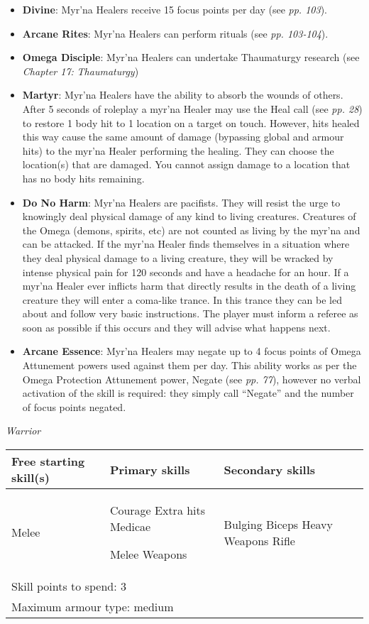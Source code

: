 \documentclass{scrbook}
\begin{document}
\begin{itemize}
\item \textbf{Divine}: Myr'na Healers receive 15 focus points per day (see \textit{pp. 103}).

\item \textbf{Arcane Rites}: Myr'na Healers can perform rituals (see \textit{pp. 103-104}).

\item \textbf{Omega Disciple}: Myr'na Healers can undertake Thaumaturgy research (see \textit{Chapter 17:} \textit{Thaumaturgy})

\item \textbf{Martyr}: Myr'na Healers have the ability to absorb the wounds of others. After 5 seconds of roleplay a myr'na Healer may use the Heal call (see \textit{pp. 28}) to restore 1 body hit to 1 location on a target on touch. However, hits healed this way cause the same amount of damage (bypassing global and armour hits) to the myr'na Healer performing the healing. They can choose the location(s) that are damaged. You cannot assign damage to a location that has no body hits remaining.

\item \textbf{Do No Harm}: Myr'na Healers are pacifists. They will resist the urge to knowingly deal physical damage of any kind to living creatures. Creatures of the Omega (demons, spirits, etc) are not counted as living by the myr'na and can be attacked. If the myr'na Healer finds themselves in a situation where they deal physical damage to a living creature, they will be wracked by intense physical pain for 120 seconds and have a headache for an hour. If a myr'na Healer ever inflicts harm that directly results in the death of a living creature they will enter a coma-like trance. In this trance they can be led about and follow very basic instructions. The player must inform a referee as soon as possible if this occurs and they will advise what happens next.

\item \textbf{Arcane Essence}: Myr'na Healers may negate up to 4 focus points of Omega Attunement powers used against them per day. This ability works as per the Omega Protection Attunement power, Negate (see \textit{pp. 77}), however no verbal activation of the skill is required: they simply call ``Negate'' and the number of focus points negated.

\end{itemize}
\textit{Warrior}

\begin{table}
\begin{tabular}{|l|l|l|} \hline 
Free starting skill(s) & Primary skills & Secondary skills \\
 \hline Melee & Courage Extra hits Medicae\par Melee Weapons & Bulging Biceps Heavy Weapons Rifle \\
 \hline \multicolumn{3}{|l|}{Skill points to spend: 3} \\
 \hline \multicolumn{3}{|l|}{Maximum armour type: medium} \\
 \hline \end{tabular}

\end{table}
\end{document}
